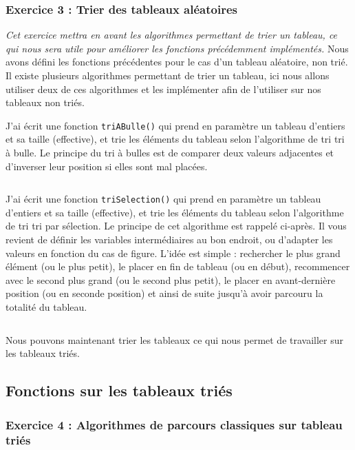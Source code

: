 \subsubsection{Exercice 3 : Trier des tableaux aléatoires}
\textit{Cet exercice mettra en avant les algorithmes permettant de trier un tableau, ce qui nous sera utile pour améliorer les fonctions précédemment implémentés.}
Nous avons défini les fonctions précédentes pour le cas d’un tableau aléatoire, non trié.
Il existe plusieurs algorithmes permettant de trier un tableau, ici nous allons utiliser deux de ces algorithmes et les implémenter afin de l'utiliser sur nos tableaux non triés.

J'ai écrit une fonction \texttt{triABulle()} qui prend en paramètre un tableau d’entiers et sa taille (effective), et trie les éléments du tableau selon l’algorithme de tri tri à bulle. Le principe du tri à bulles est de comparer deux valeurs adjacentes et d'inverser leur position si elles sont mal placées.
\inputminted[linenos,firstline=7, lastline=18]{cpp}{../sources/cpp/TP1-2/algosTri.c}

J'ai écrit une fonction \texttt{triSelection()} qui prend en paramètre un tableau d’entiers et sa taille (effective), et trie les éléments du tableau selon l’algorithme de tri tri par sélection. Le principe de cet algorithme est rappelé ci-après. Il vous revient de définir les variables intermédiaires au bon endroit, ou d’adapter les valeurs en fonction du cas de figure.
L'idée est simple : rechercher le plus grand élément (ou le plus petit), le placer en fin de tableau (ou en début), recommencer avec le second plus grand (ou le second plus petit), le placer en avant-dernière position (ou en seconde position) et ainsi de suite jusqu'à avoir parcouru la totalité du tableau.
\inputminted[linenos,firstline=20, lastline=31]{cpp}{../sources/cpp/TP1-2/algosTri.c}

Nous pouvons maintenant trier les tableaux ce qui nous permet de travailler sur les tableaux triés.

\subsection{Fonctions sur les tableaux triés}

\subsubsection{Exercice 4 : Algorithmes de parcours classiques sur tableau triés}

